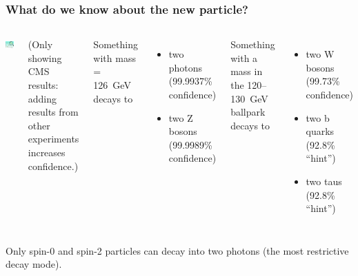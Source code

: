 \documentclass[compress]{beamer}
\begin{document}
\begin{frame}
\frametitle{What do we know about the new particle?}

\begin{columns}
\includegraphics[width=\linewidth]{new_boson_125_small.jpg}

\vspace{0.2 cm}
\begin{minipage}{\linewidth}
\scriptsize (Only showing CMS results: adding results from other experiments increases confidence.)
\end{minipage}

Something with mass = 126~GeV decays to
\begin{itemize}
\item two photons (99.9937\% confidence)
\item two Z bosons (99.9989\% confidence)
\end{itemize}
Something with a mass in the 120--130~GeV ballpark decays to
\begin{itemize}
\item two W bosons (99.73\% confidence)
\item two b quarks (92.8\% ``hint'')
\item two taus (92.8\% ``hint'')
\end{itemize}
\end{columns}

\vfill
Only spin-0 and spin-2 particles can decay into two photons (the most restrictive decay mode).
\end{frame}
\end{document}
